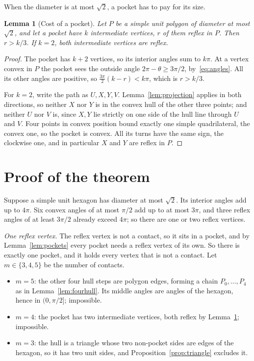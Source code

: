 \documentclass[11pt]{article}
\newtheorem{lemma}{Lemma}
\theoremstyle{remark}
\begin{document}
When the diameter is at most $\sqrt2$, a pocket has to pay for its size.

\begin{lemma}[Cost of a pocket]\label{lem:cost}
Let $P$ be a simple unit polygon of diameter at most $\sqrt2$, and let a pocket have $k$
intermediate vertices, $r$ of them reflex in $P$. Then $r>k/3$. If $k=2$, both
intermediate vertices are reflex.
\end{lemma}

\begin{proof}
The pocket has $k+2$ vertices, so its interior angles sum to $k\pi$. At a vertex convex in
$P$ the pocket sees the outside angle $2\pi-\theta\ge3\pi/2$, by~\eqref{eq:angles}. All its
other angles are positive, so $\tfrac{3\pi}{2}(k-r)<k\pi$, which is $r>k/3$.

For $k=2$, write the path as $U,X,Y,V$. Lemma~\ref{lem:projection} applies in both
directions, so neither $X$ nor $Y$ is in the convex hull of the other three points; and
neither $U$ nor $V$ is, since $X,Y$ lie strictly on one side of the hull line through $U$
and $V$. Four points in convex position bound exactly one simple quadrilateral, the
convex one, so the pocket is convex. All its turns have the same sign, the clockwise one,
and in particular $X$ and $Y$ are reflex in $P$.
\end{proof}

\section{Proof of the theorem}

Suppose a simple unit hexagon has diameter at most $\sqrt2$. Its interior angles add up to
$4\pi$. Six convex angles of at most $\pi/2$ add up to at most $3\pi$, and three reflex angles
of at least $3\pi/2$ already exceed $4\pi$; so there are one or two reflex vertices.

\emph{One reflex vertex.} The reflex vertex is not a contact, so it sits in a pocket, and
by Lemma~\ref{lem:pockets} every pocket needs a reflex vertex of its own. So there is exactly
one pocket, and it holds every vertex that is not a contact. Let $m\in\{3,4,5\}$ be the number of contacts.
\begin{itemize}
\item $m=5$: the other four hull steps are polygon edges, forming a chain $P_0,\dots,P_4$
as in Lemma~\ref{lem:fourhull}. Its middle angles are angles of the hexagon, hence in
$(0,\pi/2]$; impossible.
\item $m=4$: the pocket has two intermediate vertices, both reflex by Lemma~\ref{lem:cost};
impossible.
\item $m=3$: the hull is a triangle whose two non-pocket sides are edges of the hexagon,
so it has two unit sides, and Proposition~\ref{prop:triangle} excludes it.
\end{itemize}
\end{document}
